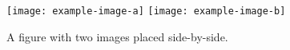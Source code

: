 \begin{figure}[thb] \centering
    \texttt{[image: example-image-a]}
    \texttt{[image: example-image-b]}
    \caption{A figure with two images placed side-by-side.} \label{fig:figure2}
\end{figure}

